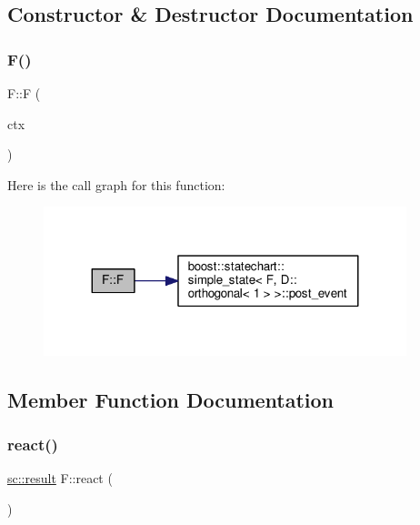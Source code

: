 \subsection{Constructor \& Destructor Documentation}
\mbox{\label{struct_f_a613aac0315d872eeea069e96de81e13a}} 
\subsubsection{\texorpdfstring{F()}{F()}}
{\footnotesize\ttfamily F\+::F (\begin{DoxyParamCaption}\item[{my\+\_\+context}]{ctx }\end{DoxyParamCaption})\hspace{0.3cm}{\ttfamily [inline]}}

Here is the call graph for this function\+:
\nopagebreak
\begin{figure}[H]
\begin{center}
\leavevmode
\includegraphics[width=299pt]{struct_f_a613aac0315d872eeea069e96de81e13a_cgraph}
\end{center}
\end{figure}


\subsection{Member Function Documentation}
\mbox{\label{struct_f_ac04f4d9a86f61f20b462cd4e33aff19a}} 
\subsubsection{\texorpdfstring{react()}{react()}\hspace{0.1cm}{\footnotesize\ttfamily [1/4]}}
{\footnotesize\ttfamily \mbox{\hyperlink{namespaceboost_1_1statechart_abe807f6598b614d6d87bb951ecd92331}{sc\+::result}} F\+::react (\begin{DoxyParamCaption}\item[{const \mbox{\hyperlink{struct_ev_check}{Ev\+Check}} \&}]{ }\end{DoxyParamCaption})}

